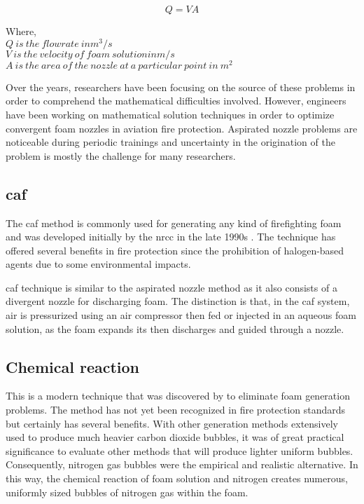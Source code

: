 \begin{equation}
    Q = VA
\end{equation}


\begin{doublespace}
    Where, \\
    $Q\ is\ the\ flowrate\ in m^3/s$ \\
    $V\ is\ the\ velocity\ of\ foam\ solution in m/s$ \\
    $A\ is\ the\ area\ of\ the\ nozzle\ at\ a\ particular\ point\ in\ m^2$ \\
\end{doublespace}

Over the years, researchers have been focusing on the source of these problems in order to comprehend the mathematical difficulties involved. However, engineers have been working on mathematical solution techniques in order to optimize convergent foam nozzles in aviation fire protection. Aspirated nozzle problems are noticeable during periodic trainings and uncertainty in the origination of the problem is mostly the challenge for many researchers.

\subsection{\Acrfull{caf}}
The \acrshort{caf} method is commonly used for generating any kind of firefighting foam and was developed initially by the \Acrfull{nrcc} in the late 1990s \cite{rie2016class}. The technique has offered several benefits in fire protection since the prohibition of halogen-based agents due to some environmental impacts.  

\acrshort{caf} technique is similar to the aspirated nozzle method as it also consists of a divergent nozzle for discharging foam. The distinction is that, in the \acrshort{caf} system, air is pressurized using an air compressor then fed or injected in an aqueous foam solution, as the foam expands its then discharges and guided through a nozzle.

\subsection{Chemical reaction}
This is a modern technique that was discovered by \cite{laundess2012suppression} to eliminate foam generation problems. The method has not yet been recognized in fire protection standards but certainly has several benefits. With other generation methods extensively used to produce much heavier carbon dioxide bubbles, it was of great practical significance to evaluate other methods that will produce lighter uniform bubbles. Consequently, nitrogen gas bubbles were the empirical and realistic alternative. In this way, the chemical reaction of foam solution and nitrogen creates numerous, uniformly sized bubbles of nitrogen gas within the foam.

